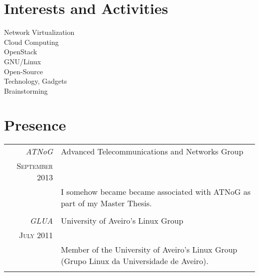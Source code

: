 \documentclass[a4paper,10pt]{article} %
\begin{document}

\section{Interests and Activities}
Network Virtualization\\
Cloud Computing\\
OpenStack\\
GNU/Linux\\
Open-Source\\
Technology, Gadgets\\
Brainstorming\\


\section{Presence}
\begin{tabular}{r|p{11cm}}
	\emph{ATNoG} & Advanced Telecommunications and Networks Group \\
	\textsc{September 2013} & \\ 
	& \footnotesize{I somehow became became associated with ATNoG as part of my Master Thesis.}\\
	\multicolumn{2}{c}{} \\
	\emph{GLUA} & University of Aveiro's Linux Group \\
	\textsc{July 2011} & \\ 
	& \footnotesize{Member of the University of Aveiro's Linux Group (Grupo Linux da Universidade de Aveiro).}\\
	\multicolumn{2}{c}{} \\
\end{tabular}


\end{document}
